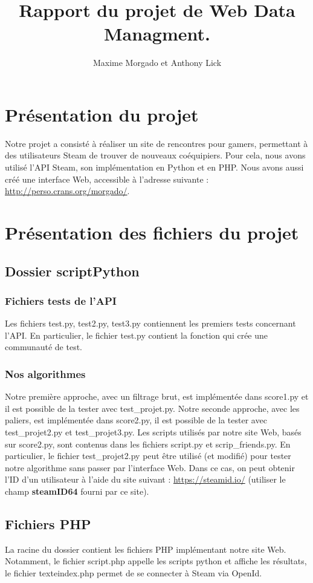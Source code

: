 \documentclass[a4paper,10pt]{article}
\title{Rapport du projet de Web Data Managment.}
\author{Maxime Morgado et Anthony Lick}
\begin{document}
\maketitle

\section{Présentation du projet}

Notre projet a consisté à réaliser un site de rencontres pour gamers, permettant à des utilisateurs Steam de trouver de nouveaux coéquipiers. 
Pour cela, nous avons utilisé l'API Steam, son implémentation en Python et en PHP. 
Nous avons aussi créé une interface Web, accessible à l'adresse suivante : \url{http://perso.crans.org/morgado/}. 

\section{Présentation des fichiers du projet}

\subsection{Dossier scriptPython}

\subsubsection{Fichiers tests de l'API}

Les fichiers test.py, test2.py, test3.py contiennent les premiers tests concernant l'API. 
En particulier, le fichier test.py contient la fonction qui crée une communauté de test. 

\subsubsection{Nos algorithmes}

Notre première approche, avec un filtrage brut, est implémentée dans score1.py et il est possible de la tester avec test\_projet.py. 
Notre seconde approche, avec les paliers, est implémentée dans score2.py, il est possible de la tester avec test\_projet2.py et test\_projet3.py. 
Les scripts utilisés par notre site Web, basés sur score2.py, sont contenus dans les fichiers script.py et scrip\_friends.py. 
En particulier, le fichier test\_projet2.py peut être utilisé (et modifié) pour tester notre algorithme sans passer par l'interface Web. 
Dans ce cas, on peut obtenir l'ID d'un utilisateur à l'aide du site suivant : \url{https://steamid.io/} (utiliser le champ \textbf{steamID64} fourni par ce site). 

\subsection{Fichiers PHP}

La racine du dossier contient les fichiers PHP implémentant notre site Web. Notamment, le fichier script.php appelle les scripts python et affiche les résultats, 
le fichier texteindex.php permet de se connecter à Steam via OpenId. 
\end{document}
